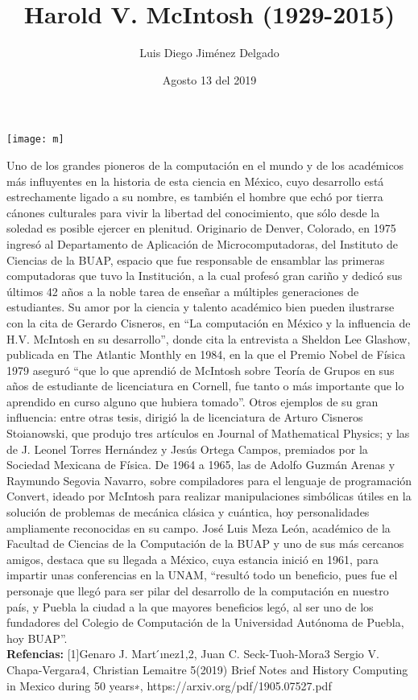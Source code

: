 \documentclass[12pt]{article}
\title{Harold V. McIntosh (1929-2015)}
\author{Luis Diego Jiménez Delgado}
\date{Agosto 13 del 2019}
\begin{document}
\maketitle

\begin{center}
\texttt{[image: m]}
\end{center}
Uno de los grandes pioneros de la computación en el mundo y de los académicos más influyentes en la historia de esta ciencia en México, cuyo desarrollo está estrechamente ligado a su nombre, es también el hombre que echó por tierra cánones culturales para vivir la libertad del conocimiento, que sólo desde la soledad es posible ejercer en plenitud.
Originario de Denver, Colorado, en 1975 ingresó al Departamento de Aplicación de Microcomputadoras, del Instituto de Ciencias de la BUAP, espacio que fue responsable de ensamblar las primeras computadoras que tuvo la Institución, a la cual profesó gran cariño y dedicó sus últimos 42 años a la noble tarea de enseñar a múltiples generaciones de estudiantes.
Su amor por la ciencia y talento académico bien pueden ilustrarse con la cita de Gerardo Cisneros, en “La computación en México y la influencia de H.V. McIntosh en su desarrollo”, donde cita la entrevista a Sheldon Lee Glashow, publicada en The Atlantic Monthly en 1984, en la que el Premio Nobel de Física 1979 aseguró “que lo que aprendió de McIntosh sobre Teoría de Grupos en sus años de estudiante de licenciatura en Cornell, fue tanto o más importante que lo aprendido en curso alguno que hubiera tomado”.
Otros ejemplos de su gran influencia: entre otras tesis, dirigió la de licenciatura de Arturo Cisneros Stoianowski, que produjo tres artículos en Journal of Mathematical Physics; y las de J. Leonel Torres Hernández y Jesús Ortega Campos, premiados por la Sociedad Mexicana de Física. De 1964 a 1965, las de Adolfo Guzmán Arenas y Raymundo Segovia Navarro, sobre compiladores para el lenguaje de programación Convert, ideado por McIntosh para realizar manipulaciones simbólicas útiles en la solución de problemas de mecánica clásica y cuántica, hoy personalidades ampliamente reconocidas en su campo.
José Luis Meza León, académico de la Facultad de Ciencias de la Computación de la BUAP y uno de sus más cercanos amigos, destaca que su llegada a México, cuya estancia inició en 1961, para impartir unas conferencias en la UNAM, “resultó todo un beneficio, pues fue el personaje que llegó para ser pilar del desarrollo de la computación en nuestro país, y Puebla la ciudad a la que mayores beneficios legó, al ser uno de los fundadores del Colegio de Computación de la Universidad Autónoma de Puebla, hoy BUAP”.
\\
\textbf{Refencias:}
[1]Genaro J. Mart ́ınez1,2, Juan C. Seck-Tuoh-Mora3 Sergio V. Chapa-Vergara4, Christian Lemaitre 5(2019) Brief Notes and History Computing in Mexico during 50 years∗, https://arxiv.org/pdf/1905.07527.pdf
\end{document}
